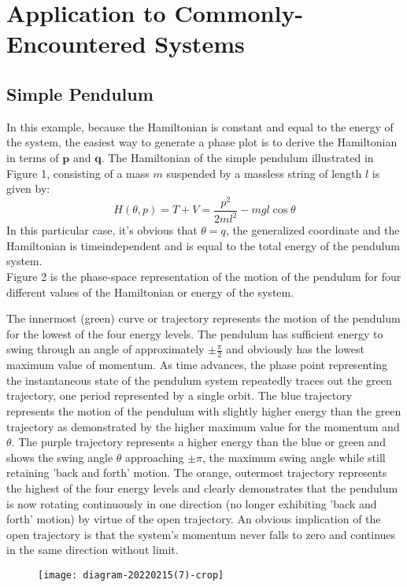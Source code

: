 \section{Application to Commonly-Encountered Systems}
\subsection{ Simple Pendulum}
In this example, because the Hamiltonian is constant and equal to the energy of the system, the easiest way to generate a phase plot is to derive the Hamiltonian in terms of $\boldsymbol{p}$ and $\boldsymbol{q}$. The Hamiltonian of the simple pendulum illustrated in Figure 1, consisting of a mass $m$ suspended by a massless string of length $l$ is given by:
$$
H(\theta, p)=T+V=\frac{p^{2}}{2 m l^{2}}-m g l \cos \theta
$$
In this particular case, it's obvious that $\theta=q$, the generalized coordinate and the Hamiltonian is timeindependent and is equal to the total energy of the pendulum system.\\
Figure 2 is the phase-space representation of the motion of the pendulum for four different values of the Hamiltonian or energy of the system.\\
 \par The innermost (green) curve or trajectory represents the motion of the pendulum for the lowest of the four energy levels. The pendulum has sufficient energy to swing through an angle of approximately $\pm \frac{\pi}{2}$ and obviously has the lowest maximum value of momentum. As time advances, the phase point representing the instantaneous state of the pendulum system repeatedly traces out the green trajectory, one period represented by a single orbit.
The blue trajectory represents the motion of the pendulum with slightly higher energy than the green trajectory as demonstrated by the higher maximum value for the momentum and $\theta$.
The purple trajectory represents a higher energy than the blue or green and shows the swing angle $\theta$ approaching $\pm \pi$, the maximum swing angle while still retaining 'back and forth' motion.
The orange, outermost trajectory represents the highest of the four energy levels and clearly demonstrates that the pendulum is now rotating continuously in one direction (no longer exhibiting 'back and forth' motion) by virtue of the open trajectory. An obvious implication of the open trajectory is that the system's momentum never falls to zero and continues in the same direction without limit.\\
\begin{figure}[H]
	\centering
	\texttt{[image: diagram-20220215(7)-crop]}
	\caption{}
	\label{}
\end{figure}
